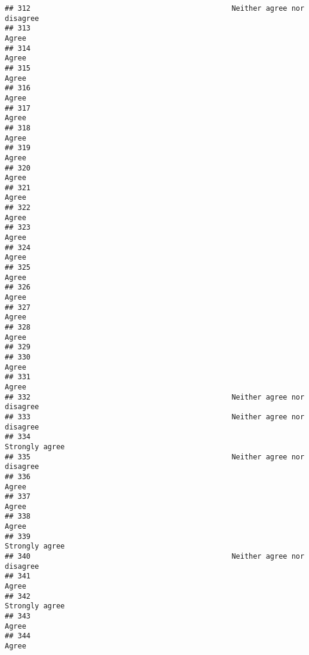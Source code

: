 \documentclass[
]{article}
\begin{document}
\begin{verbatim}
## 312                                               Neither agree nor disagree
## 313                                                                    Agree
## 314                                                                    Agree
## 315                                                                    Agree
## 316                                                                    Agree
## 317                                                                    Agree
## 318                                                                    Agree
## 319                                                                    Agree
## 320                                                                    Agree
## 321                                                                    Agree
## 322                                                                    Agree
## 323                                                                    Agree
## 324                                                                    Agree
## 325                                                                    Agree
## 326                                                                    Agree
## 327                                                                    Agree
## 328                                                                    Agree
## 329                                                                         
## 330                                                                    Agree
## 331                                                                    Agree
## 332                                               Neither agree nor disagree
## 333                                               Neither agree nor disagree
## 334                                                           Strongly agree
## 335                                               Neither agree nor disagree
## 336                                                                    Agree
## 337                                                                    Agree
## 338                                                                    Agree
## 339                                                           Strongly agree
## 340                                               Neither agree nor disagree
## 341                                                                    Agree
## 342                                                           Strongly agree
## 343                                                                    Agree
## 344                                                                    Agree

\end{verbatim}
\end{document}
